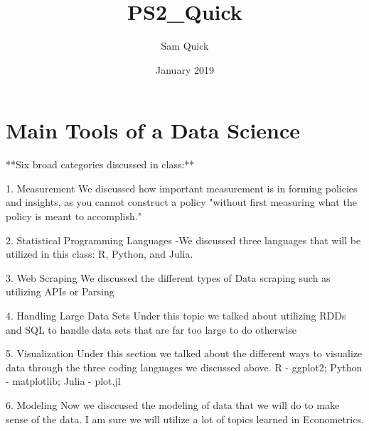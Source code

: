 \documentclass{article}
\title{PS2_Quick}
\author{Sam Quick}
\date{January 2019}
\begin{document}
\maketitle

\section{Main Tools of a Data Science}
**Six broad categories discussed in class:**



1. Measurement
    We discussed how important measurement is in forming policies and insights, as you cannot construct a policy "without first measuring what the policy is meant to accomplish."
    
2. Statistical Programming Languages
    -We discussed three languages that will be utilized in this class: R, Python, and Julia.

3. Web Scraping
    We discussed the different types of Data scraping such as utilizing APIs or Parsing
    
4. Handling Large Data Sets
    Under this topic we talked about utilizing RDDs and SQL to handle data sets that are far too large to do otherwise
    
5. Visualization
    Under this section we talked about the different ways to visualize data through the three coding languages we discussed above. 
    R - ggplot2; Python - matplotlib; Julia - plot.jl
    
6. Modeling
    Now we disccused the modeling of data that we will do to make sense of the data. I am sure we will utilize a lot of topics learned in Econometrics.
\end{document}
